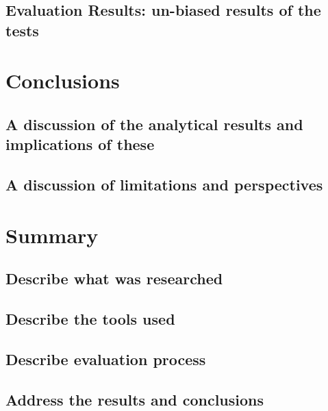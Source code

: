 \section{Evaluation Results: un-biased results of the tests}


\chapter{Conclusions}
\section{A discussion of the analytical results and implications of these}

\section{A discussion of limitations and perspectives}


\chapter{Summary}
\section{Describe what was researched}

\section{Describe the tools used}

\section{Describe evaluation process}

\section{Address the results and conclusions}


